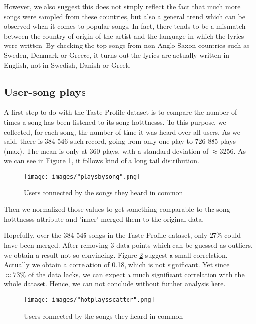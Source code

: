 \documentclass[10pt]{article}
\renewcommand\_{\textunderscore\allowbreak}
\begin{document}
However, we also suggest this does not simply reflect the fact that much more songs were sampled from these countries, but also a general trend which can be observed when it comes to popular songs.
In fact, there tends to be a mismatch between the country of origin of the artist and the language in which the lyrics were written.
By checking the top songs from non Anglo-Saxon countries such as Sweden, Denmark or Greece, it turns out the lyrics are actually written in English, not in Swedish, Danish or Greek.

\subsection{User-song plays}
A first step to do with the Taste Profile dataset is to compare the number of times a song has been listened to its song hotttnesss. To this purpose, we collected, for each song, the number of time it was heard over all users. As we said, there is 384 546 such record, going from only one play to 726 885 plays (max). The mean is only at 360 plays, with a standard deviation of $\approx$3256. As we can see in Figure \ref{fig:play_by_song}, it follows kind of a long tail distribution. 

\begin{figure}[h!]
\centering
\captionsetup{width=\textwidth}
\texttt{[image: images/"plays\_by\_song".png]}
\caption{Users connected by the songs they heard in common}
\label{fig:play_by_song}
\end{figure}

Then we normalized those values to get something comparable to the song hotttnesss attribute and 'inner' merged them to the original data.

Hopefully, over the 384 546 songs in the Taste Profile dataset, only $27\%$ could have been merged. After removing 3 data points which can be guessed as outliers, we obtain a result not so convincing. Figure \ref{fig:hot_plays_scatter} suggest a small correlation. Actually we obtain a correlation of 0.18, which is not significant. Yet since $\approx73\%$ of the data lacks, we can expect a much significant correlation with the whole dataset. Hence, we can not conclude without further analysis here.

\begin{figure}[h!]
\centering
\captionsetup{width=\textwidth}
\texttt{[image: images/"hot\_plays\_scatter".png]}
\caption{Users connected by the songs they heard in common}
\label{fig:hot_plays_scatter}
\end{figure}
\end{document}
